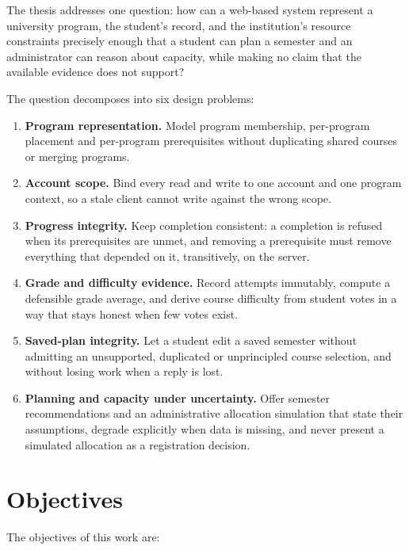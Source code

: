 The thesis addresses one question: how can a web-based system represent a university program, the
student's record, and the institution's resource constraints precisely enough that a student can
plan a semester and an administrator can reason about capacity, while making no claim that the
available evidence does not support?

The question decomposes into six design problems:

\begin{enumerate}
  \item \textbf{Program representation.} Model program membership, per-program placement and
        per-program prerequisites without duplicating shared courses or merging programs.
  \item \textbf{Account scope.} Bind every read and write to one account and one program context,
        so a stale client cannot write against the wrong scope.
  \item \textbf{Progress integrity.} Keep completion consistent: a completion is refused when its
        prerequisites are unmet, and removing a prerequisite must remove everything that depended
        on it, transitively, on the server.
  \item \textbf{Grade and difficulty evidence.} Record attempts immutably, compute a defensible
        grade average, and derive course difficulty from student votes in a way that stays honest
        when few votes exist.
  \item \textbf{Saved-plan integrity.} Let a student edit a saved semester without admitting an
        unsupported, duplicated or unprincipled course selection, and without losing work when a
        reply is lost.
  \item \textbf{Planning and capacity under uncertainty.} Offer semester recommendations and an
        administrative allocation simulation that state their assumptions, degrade explicitly when
        data is missing, and never present a simulated allocation as a registration decision.
\end{enumerate}

\section{Objectives}

The objectives of this work are:


